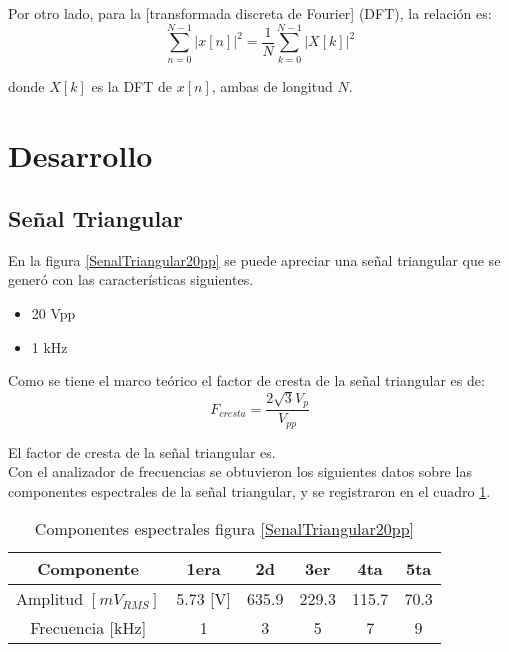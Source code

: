 \documentclass{article}
\begin{document}
Por otro lado, para la [transformada discreta de Fourier] (DFT), la relación es:\citep{RelacionParseval}\\

\begin{equation}
    \sum_{n=0}^{N-1} | x[n] |^2  =   \frac{1}{N} \sum_{k=0}^{N-1} | X[k] |^2
\end{equation}

donde $X[k]$ es la DFT de $x[n]$, ambas de longitud $N$.\citep{RelacionParseval}\\


\section{Desarrollo}

\subsection{Señal Triangular}

En la figura \ref{SenalTriangular20pp} se puede apreciar una señal triangular que se generó con las características siguientes.\\

\begin{itemize}
    \item 20 Vpp
    \item 1 kHz
\end{itemize}

Como se tiene el marco teórico el factor de cresta de la señal triangular es de:\\

\begin{equation}
    F_{cresta}=\frac{2\sqrt{3}V_p}{V_{pp}}
\end{equation}
 
 El factor de cresta de la señal triangular es.\\
 
 Con el analizador de frecuencias se obtuvieron los siguientes datos sobre las componentes espectrales de la señal triangular, y se registraron en el cuadro \ref{tablaEspectralTriang20Vpp}.\\
 
 \begin{table}[h!]
\centering
\begin{tabular}{|c|c|c|c|c|c|}
\hline
Componente            & 1era         & 2d    & 3er   & 4ta   & 5ta  \\ \hline
Amplitud $[mV_{RMS}]$ & 5.73 {[}V{]} & 635.9 & 229.3 & 115.7 & 70.3 \\ \hline
Frecuencia {[}kHz{]}  & 1            & 3     & 5     & 7     & 9    \\ \hline
\end{tabular}

\caption{Componentes espectrales figura \ref{SenalTriangular20pp}}

\label{tablaEspectralTriang20Vpp}

\end{table}
\end{document}
